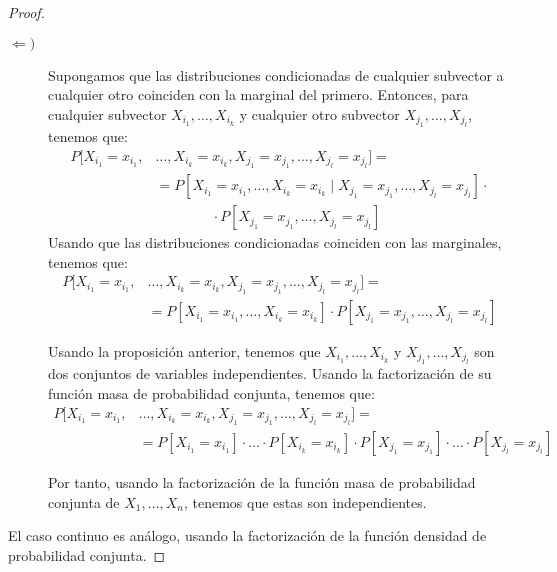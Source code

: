 \begin{proof}
\begin{description}
        \item[$\Longleftarrow)$] Supongamos que las distribuciones condicionadas de cualquier subvector a cualquier otro coinciden con la marginal del primero. Entonces, para cualquier subvector $X_{i_1}, \ldots, X_{i_k}$ y cualquier otro subvector $X_{j_1}, \ldots, X_{j_l}$, tenemos que:
        \begin{align*}
            P[X_{i_1} = x_{i_1}, &\ldots, X_{i_k} = x_{i_k}, X_{j_1} = x_{j_1}, \ldots, X_{j_l} = x_{j_l}]
            =\\&= P[X_{i_1} = x_{i_1}, \ldots, X_{i_k} = x_{i_k}\mid X_{j_1} = x_{j_1}, \ldots, X_{j_l} = x_{j_l}] \cdot\\&\qquad\qquad \cdot  P[X_{j_1} = x_{j_1}, \ldots, X_{j_l} = x_{j_l}]
        \end{align*}
        Usando que las distribuciones condicionadas coinciden con las marginales, tenemos que:
        \begin{align*}
            P[X_{i_1} = x_{i_1}, &\ldots, X_{i_k} = x_{i_k}, X_{j_1} = x_{j_1}, \ldots, X_{j_l} = x_{j_l}]
            =\\&= P[X_{i_1} = x_{i_1}, \ldots, X_{i_k} = x_{i_k}] \cdot P[X_{j_1} = x_{j_1}, \ldots, X_{j_l} = x_{j_l}]
        \end{align*}

        Usando la proposición anterior, tenemos que $X_{i_1}, \ldots, X_{i_k}$ y $X_{j_1}, \ldots, X_{j_l}$ son dos conjuntos de variables independientes. Usando la factorización de su función masa de probabilidad conjunta, tenemos que:
        \begin{align*}
            P[X_{i_1} = x_{i_1}, &\ldots, X_{i_k} = x_{i_k}, X_{j_1} = x_{j_1}, \ldots, X_{j_l} = x_{j_l}]
            =\\&= P[X_{i_1} = x_{i_1}] \cdot \ldots \cdot P[X_{i_k} = x_{i_k}] \cdot P[X_{j_1} = x_{j_1}] \cdot \ldots \cdot P[X_{j_l} = x_{j_l}]
        \end{align*}

        Por tanto, usando la factorización de la función masa de probabilidad conjunta de $X_1, \ldots, X_n$, tenemos que estas son independientes.
    \end{description}

    El caso continuo es análogo, usando la factorización de la función densidad de probabilidad conjunta.
\end{proof}

